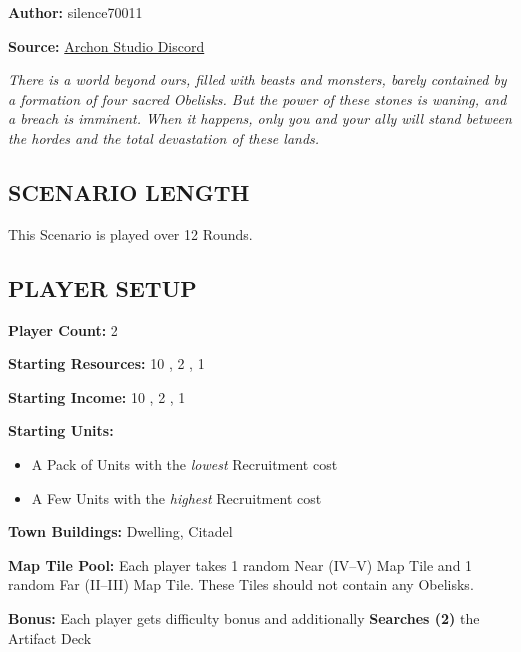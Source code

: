 
\begin{multicols}{2}

\textbf{Author:} silence70011

\textbf{Source:} \href{https://discord.com/channels/740870068178649108/1233112440322002964/1233112440322002964}{Archon Studio Discord}

\textit{There is a world beyond ours, filled with beasts and monsters, barely contained by a formation of four sacred Obelisks.
  But the power of these stones is waning, and a breach is imminent.
  When it happens, only you and your ally will stand between the hordes and the total devastation of these lands.
}

\subsection*{\MakeUppercase{Scenario Length}}

This Scenario is played over 12 Rounds.

\subsection*{\MakeUppercase{Player Setup}}

\textbf{Player Count:} 2

\textbf{Starting Resources:} 10 , 2 , 1 

\textbf{Starting Income:} 10 , 2 , 1 

\textbf{Starting Units:}
\begin{itemize}
  \item A Pack of  Units with the \textit{lowest} Recruitment cost
  \item A Few  Units with the \textit{highest} Recruitment cost
\end{itemize}

\textbf{Town Buildings:}  Dwelling, Citadel

\textbf{Map Tile Pool:} Each player takes 1 random Near (IV--V) Map Tile and 1 random Far (II--III) Map Tile. These Tiles should not contain any Obelisks.

\textbf{Bonus:} Each player gets difficulty bonus and additionally \textbf{Searches (2)} the Artifact Deck
\vspace*{\fill}\columnbreak


\end{multicols}
